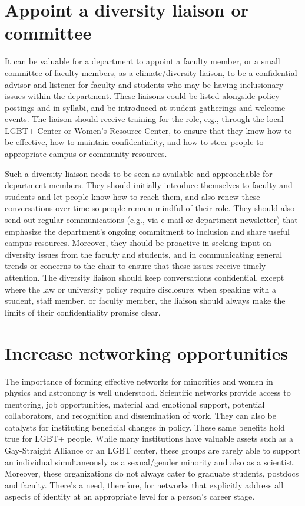 \section {Appoint a diversity liaison or committee}
\label{liaison}
It can be valuable for a department to appoint a faculty member, or a small committee of faculty members, as a climate/diversity liaison, to be a confidential advisor and listener for faculty and students who may be having inclusionary issues within the department. These liaisons could be listed alongside policy postings and in syllabi, and be introduced at student gatherings and welcome events. The liaison should receive training for the role, e.g., through the local LGBT+ Center or Women's Resource Center, to ensure that they know how to be effective, how to maintain confidentiality, and how to steer people to appropriate campus or community resources. 

Such a diversity liaison needs to be seen as available and approachable for department members. They should initially introduce themselves to faculty and students and let people know how to reach them, and also renew these conversations over time so people remain mindful of their role. They should also send out regular communications (e.g., via e-mail or department newsletter) that emphasize the department's ongoing commitment to inclusion and share useful campus resources. Moreover, they should be proactive in seeking input on diversity issues from the faculty and students, and in communicating general trends or concerns to the chair to ensure that these issues receive timely attention. The diversity liaison should keep conversations confidential, except where the law or university policy require disclosure; when speaking with a student, staff member, or faculty member, the liaison should always make the limits of their confidentiality promise clear.


\section {Increase networking opportunities}
\label{networking}
The importance of forming effective networks for minorities and women in physics and astronomy is well understood. Scientific networks provide access to mentoring, job opportunities, material and emotional support, potential collaborators, and recognition and dissemination of work. They can also be catalysts for instituting beneficial changes in policy. These same benefits hold true for LGBT+ people. While many institutions have valuable assets such as a Gay-Straight Alliance or an LGBT center, these groups are rarely able to support an individual simultaneously as a sexual/gender minority and also as a scientist. Moreover, these organizations do not always cater to graduate students, postdocs and faculty. There's a need, therefore, for networks that explicitly address all aspects of identity at an appropriate level for a person's career stage.

